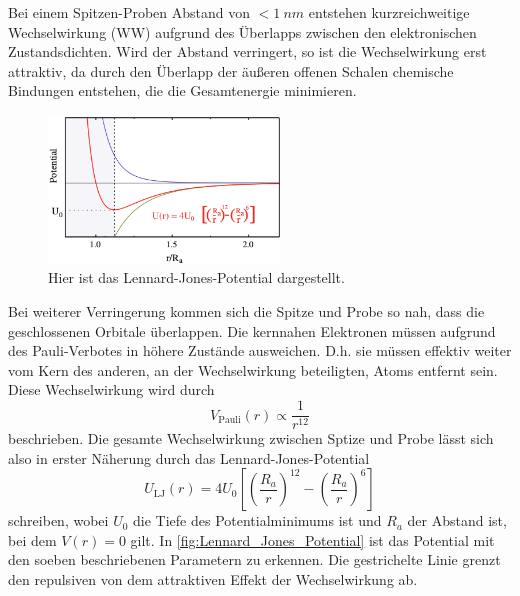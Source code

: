     Bei einem Spitzen-Proben Abstand von $< \SI{1}{nm}$ entstehen kurzreichweitige Wechselwirkung (WW) aufgrund des Überlapps zwischen den elektronischen Zustandsdichten.
    Wird der Abstand verringert, so ist die Wechselwirkung erst attraktiv, da durch den Überlapp der äußeren offenen Schalen chemische Bindungen entstehen, die die Gesamtenergie minimieren. \\
    \setlength{\columnsep}{15pt}
    \begin{figure}
        \vspace{-0.5cm}
        \centering{}
        \includegraphics[width=0.55\textwidth]{bilder/Lennard_Jones_Potential.png}
        \caption{Hier ist das Lennard-Jones-Potential dargestellt. \cite{voigtlaender}} \vspace*{-0.5cm}
        \label{fig:Lennard_Jones_Potential}
    \end{figure}
    Bei weiterer Verringerung kommen sich die Spitze und Probe so nah, dass die geschlossenen Orbitale überlappen.
    Die kernnahen Elektronen müssen aufgrund des Pauli-Verbotes in höhere Zustände ausweichen.
    D.h. sie müssen effektiv weiter vom Kern des anderen, an der Wechselwirkung beteiligten, Atoms entfernt sein.
    Diese Wechselwirkung wird durch
    \begin{equation}
        V_{\mathrm{Pauli}}(r) \propto \frac{1}{r^{12}}
    \end{equation}
    beschrieben.
    Die gesamte Wechselwirkung zwischen Sptize und Probe lässt sich also in erster Näherung durch das Lennard-Jones-Potential
    \begin{equation}
        U_{\mathrm{LJ}}(r) = 4 U_0 \left[\left(\frac{R_a}{r}\right)^{12} - \left(\frac{R_a}{r}\right)^6\right]
        \label{eqn:Lennard_Jones_Potential}
    \end{equation}
    schreiben, wobei $U_0$ die Tiefe des Potentialminimums ist und $R_a$ der Abstand ist, bei dem $V(r) = 0$ gilt.
    In \autoref{fig:Lennard_Jones_Potential} ist das Potential mit den soeben beschriebenen Parametern zu erkennen.
    Die gestrichelte Linie grenzt den repulsiven von dem attraktiven Effekt der Wechselwirkung ab.

